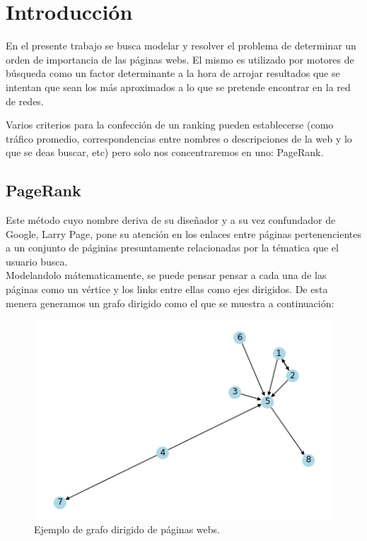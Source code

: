 \section{Introducción}

En el presente trabajo se busca modelar y resolver el problema de determinar un orden de importancia de las páginas webs. El mismo es utilizado por motores de búsqueda como un factor determinante a la hora de arrojar resultados que se intentan que sean los más aproximados a lo que se pretende encontrar en la red de redes.

Varios criterios para la confección de un ranking pueden establecerse (como tráfico promedio, correspondencias entre nombres o descripciones de la web y lo que se deas buscar, etc) pero solo nos concentraremos en uno: PageRank.  \\

\subsection{PageRank}

Este método cuyo nombre deriva de su diseñador y a su vez confundador de Google, Larry Page, pone su atención en los enlaces entre páginas pertenencientes a un conjunto de páginias presuntamente relacionadas por la tématica que el usuario busca.\\

Modelandolo mátematicamente, se puede pensar pensar a cada una de las páginas como un vértice y los links entre ellas como ejes dirigidos. De esta menera generamos un grafo dirigido como el que se muestra a continuación:   

\begin{figure}[H]
   \begin{center}
     \includegraphics{img/ejemplo.png} 
  \end{center}
\caption{Ejemplo de grafo dirigido de páginas webs.} \label{fig:ejemplo}
\end{figure}

